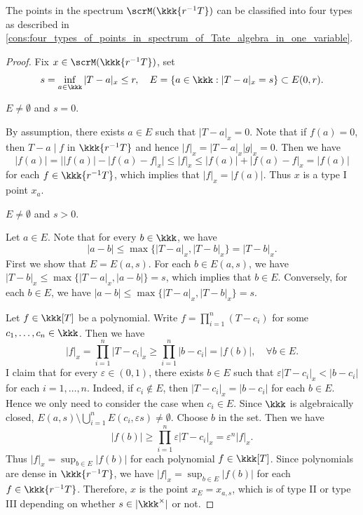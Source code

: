    \begin{proposition}\label{prop:four_types_of_points_in_spectrum_of_Tate_algebra_in_one_variable}
        The points in the spectrum \(\scrM(\kkk\{r^{-1}T\})\) can be classified into four types as described in \cref{cons:four_types_of_points_in_spectrum_of_Tate_algebra_in_one_variable}.
    \end{proposition}
    \begin{proof}
        Fix \(x \in \scrM(\kkk\{r^{-1}T\})\), set 
        \[ s = \inf_{a \in \kkk} |T - a|_x \leq r,\quad  E = \{a \in \kkk : |T - a|_x = s\} \subset E(0,r). \]

        \begin{case}\label{case_in_proof_of_four_type_points:point_type_I}
            \(E \neq \emptyset\) and \(s=0\). 
        \end{case}
        By assumption, there exists \(a \in E\) such that \(|T - a|_x = 0\).
        Note that if \(f(a) = 0\), then \(T-a \mid f\) in \(\kkk\{r^{-1}T\}\) and hence \(|f|_x = |T - a|_x|g|_x = 0\).
        Then we have 
        \[ |f(a)| = \big| |f(a)| - |f(a) - f|_x \big| \leq |f|_x \leq |f(a)| + |f(a) - f|_x = |f(a)| \]
        for each \(f \in \kkk\{r^{-1}T\}\), which implies that \(|f|_x = |f(a)|\).
        Thus \(x\) is a type I point \(x_a\).

        \begin{case}\label{case_in_proof_of_four_type_points:point_type_II_and_III}
            \(E \neq \emptyset\) and \(s > 0\).
        \end{case}
        Let \(a \in E\).
        Note that for every \(b \in \kkk\), we have 
        \[ |a-b| \leq \max\{|T - a|_x, |T - b|_x\} = |T - b|_x. \]
        First we show that \(E = E(a,s)\).
        For each \(b \in E(a,s)\), we have \(|T - b|_x \leq \max\{|T - a|_x, |a - b|\} = s\), which implies that \(b \in E\).
        Conversely, for each \(b \in E\), we have \(|a - b| \leq \max\{|T - a|_x, |T - b|_x\} = s\).

        Let \(f \in \kkk[T]\) be a polynomial.
        Write \(f = \prod_{i=1}^n (T - c_i)\) for some \(c_1, \ldots, c_n \in \kkk\).
        Then we have
        \[ |f|_x = \prod_{i=1}^n |T - c_i|_x \geq \prod_{i=1}^n |b - c_i| = |f(b)|, \quad \forall b \in E. \]
        I claim that for every \(\varepsilon \in (0,1)\), there exists \(b \in E\) such that \(\varepsilon |T-c_i|_x < |b - c_i|\) for each \(i = 1, \ldots, n\).
        Indeed, if \(c_i \notin E\), then \(|T-c_i|_x = |b - c_i|\) for each \(b \in E\).
        Hence we only need to consider the case when \(c_i \in E\).
        Since \(\kkk\) is algebraically closed, \(E(a,s) \setminus \bigcup_{i=1}^n E(c_i,\varepsilon s) \neq \emptyset\).
        Choose \(b\) in the set.
        Then we have 
        \[ |f(b)| \geq \prod_{i=1}^n \varepsilon |T - c_i|_x = \varepsilon^n |f|_x. \]
        Thus \(|f|_x = \sup_{b \in E} |f(b)|\) for each polynomial \(f \in \kkk[T]\).
        Since polynomials are dense in \(\kkk\{r^{-1}T\}\), we have \(|f|_x = \sup_{b \in E} |f(b)|\) for each \(f \in \kkk\{r^{-1}T\}\).
        Therefore, \(x\) is the point \(x_E = x_{a,s}\), which is of type II or type III depending on whether \(s \in |\kkk^\times|\) or not.


\end{proof}
